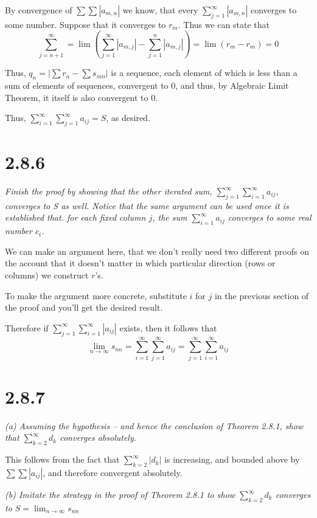 \documentclass[11pt,oneside,titlepage]{book}
\begin{document}
By convergence of $\sum \sum |a_{m,n}|$ we know, that every
$\sum_{j = 1}^{\infty} |a_{m,n}|$
converges to some number. Suppose that it converges to $r_m$. 
Thus we can state that
$$\sum_{j = n + 1}^{\infty} = \lim(\sum_{j = 1}^{\infty} |a_{m,j}| - \sum_{j = 1}^{n} |a_{m,j}|) = \lim(r_m - r_m) = 0$$

Thus, $q_n = \left|\sum r_n - \sum s_{mn}\right|$ is a sequence,
each element of which is less than a sum of elements of sequences,
convergent to 0, and thus, by Algebraic Limit Theorem, it itself
is also convergent to 0.

Thus,   $\sum_{i=1}^{\infty}\sum_{j=1}^{\infty} a_{ij} = S$, as desired.

\section*{2.8.6}
\textit{Finish the proof by showing that the other iterated sum, $\sum_{j=1}^{\infty}\sum_{i=1}^{\infty} a_{ij}$, converges to S as well. Notice that the
  same argument can be used once it is established that. for each fixed column
  $j$, the sum $\sum_{i = 1}^{\infty} a_{ij}$ converges to some real number
  $c_i$.}

We can make an argument here, that we don't really need two different proofs
on the account that it doesn't matter in which particular direction (rows or
columns) we construct $r$'s.

To make the argument more concrete, substitute $i$ for $j$  in the
previous section of the proof and you'll get the desired result.

Therefore if $\sum_{j = 1}^{\infty}\sum_{i = 1}^{\infty}|a_{ij}|$ exists,
then it follows that 
$$\lim_{n \to \infty} s_{nn} = \sum_{i = 1}^{\infty}\sum_{j = 1}^{\infty}a_{ij} = \sum_{j = 1}^{\infty}\sum_{i = 1}^{\infty}a_{ij}$$

\section*{2.8.7}
\textit{(a) Assuming the hypothesis -- and hence the conclusion of
  Theorem 2.8.1, show that $\sum_{k = 2}^{\infty}d_k$ converges absolutely.}

This follows from the fact that $\sum_{k = 2}^{\infty}|d_k|$ is increasing, and bounded
above by $\sum \sum |a_{ij}|$, and therefore convergent absolutely.

\textit{(b) Imitate the strategy in the proof of Theorem 2.8.1 to show
  $\sum_{k=2}^{\infty} d_k$ converges to $S = \lim_{n \to \infty}s_{nn}$}
\end{document}
